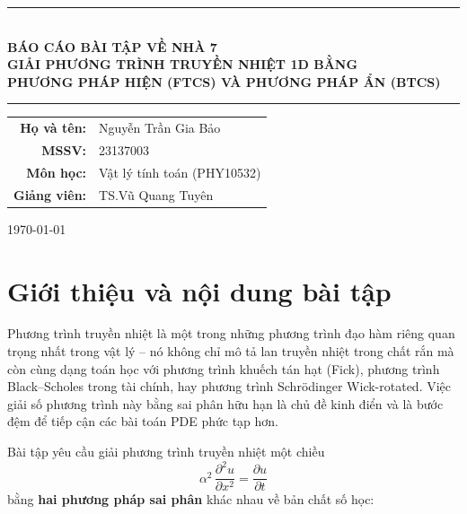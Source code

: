 \documentclass[12pt,a4paper]{article}
\begin{document}
\begin{titlepage}
    \centering
    \vspace*{2cm}

    \rule{\textwidth}{1pt} \\[0.5cm]
    {\huge \textbf{BÁO CÁO BÀI TẬP VỀ NHÀ 7}} \\[0.4cm]
    {\large \textbf{GIẢI PHƯƠNG TRÌNH TRUYỀN NHIỆT 1D BẰNG}} \\[0.2cm]
    {\large \textbf{PHƯƠNG PHÁP HIỆN (FTCS) VÀ PHƯƠNG PHÁP ẨN (BTCS)}} \\[0.2cm]
    \rule{\textwidth}{1pt}

    \vspace{2cm}

    {\large
    \begin{tabular}{rl}
        \textbf{Họ và tên:}  & Nguyễn Trần Gia Bảo \\[4pt]
        \textbf{MSSV:}       & 23137003 \\[4pt]
        \textbf{Môn học:}    & Vật lý tính toán (PHY10532) \\[4pt]
        \textbf{Giảng viên:} & TS.\@ Vũ Quang Tuyên \\
    \end{tabular}
    }

    \vfill
    {\large \today}
\end{titlepage}

\newpage
\tableofcontents
\newpage

\section{Giới thiệu và nội dung bài tập}

Phương trình truyền nhiệt là một trong những phương trình đạo hàm riêng quan trọng nhất trong vật lý -- nó không chỉ mô tả lan truyền nhiệt trong chất rắn mà còn cùng dạng toán học với phương trình khuếch tán hạt (Fick), phương trình Black--Scholes trong tài chính, hay phương trình Schrödinger Wick-rotated. Việc giải số phương trình này bằng sai phân hữu hạn là chủ đề kinh điển và là bước đệm để tiếp cận các bài toán PDE phức tạp hơn.

Bài tập yêu cầu giải phương trình truyền nhiệt một chiều
\begin{equation}
    \alpha^2\,\frac{\partial^2 u}{\partial x^2} = \frac{\partial u}{\partial t}
    \label{eq:heat_intro}
\end{equation}
bằng \textbf{hai phương pháp sai phân} khác nhau về bản chất số học:
\end{document}
